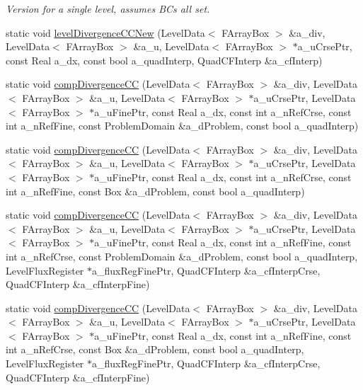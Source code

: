 \begin{DoxyCompactItemize}
\begin{DoxyCompactList}\small\item\em Version for a single level, assumes B\-Cs all set. \end{DoxyCompactList}\item 
static void \hyperlink{class_divergence_a77ec6a5b421cc2360223b7b0879786e8}{level\-Divergence\-C\-C\-New} (Level\-Data$<$ F\-Array\-Box $>$ \&a\-\_\-div, Level\-Data$<$ F\-Array\-Box $>$ \&a\-\_\-u, Level\-Data$<$ F\-Array\-Box $>$ $\ast$a\-\_\-u\-Crse\-Ptr, const Real a\-\_\-dx, const bool a\-\_\-quad\-Interp, Quad\-C\-F\-Interp \&a\-\_\-cf\-Interp)
\item 
static void \hyperlink{class_divergence_af3bff43b62b95d79fcd50484019e3e41}{comp\-Divergence\-C\-C} (Level\-Data$<$ F\-Array\-Box $>$ \&a\-\_\-div, Level\-Data$<$ F\-Array\-Box $>$ \&a\-\_\-u, Level\-Data$<$ F\-Array\-Box $>$ $\ast$a\-\_\-u\-Crse\-Ptr, Level\-Data$<$ F\-Array\-Box $>$ $\ast$a\-\_\-u\-Fine\-Ptr, const Real a\-\_\-dx, const int a\-\_\-n\-Ref\-Crse, const int a\-\_\-n\-Ref\-Fine, const Problem\-Domain \&a\-\_\-d\-Problem, const bool a\-\_\-quad\-Interp)
\item 
static void \hyperlink{class_divergence_ad1d85e2db60cacec07a004c9d0b19b24}{comp\-Divergence\-C\-C} (Level\-Data$<$ F\-Array\-Box $>$ \&a\-\_\-div, Level\-Data$<$ F\-Array\-Box $>$ \&a\-\_\-u, Level\-Data$<$ F\-Array\-Box $>$ $\ast$a\-\_\-u\-Crse\-Ptr, Level\-Data$<$ F\-Array\-Box $>$ $\ast$a\-\_\-u\-Fine\-Ptr, const Real a\-\_\-dx, const int a\-\_\-n\-Ref\-Crse, const int a\-\_\-n\-Ref\-Fine, const Box \&a\-\_\-d\-Problem, const bool a\-\_\-quad\-Interp)
\item 
static void \hyperlink{class_divergence_a4bafaf6a0fee4270b05bfb1b31c915ed}{comp\-Divergence\-C\-C} (Level\-Data$<$ F\-Array\-Box $>$ \&a\-\_\-div, Level\-Data$<$ F\-Array\-Box $>$ \&a\-\_\-u, Level\-Data$<$ F\-Array\-Box $>$ $\ast$a\-\_\-u\-Crse\-Ptr, Level\-Data$<$ F\-Array\-Box $>$ $\ast$a\-\_\-u\-Fine\-Ptr, const Real a\-\_\-dx, const int a\-\_\-n\-Ref\-Fine, const int a\-\_\-n\-Ref\-Crse, const Problem\-Domain \&a\-\_\-d\-Problem, const bool a\-\_\-quad\-Interp, Level\-Flux\-Register $\ast$a\-\_\-flux\-Reg\-Fine\-Ptr, Quad\-C\-F\-Interp \&a\-\_\-cf\-Interp\-Crse, Quad\-C\-F\-Interp \&a\-\_\-cf\-Interp\-Fine)
\item 
static void \hyperlink{class_divergence_ab20b13344306e041cbf99e4234a46244}{comp\-Divergence\-C\-C} (Level\-Data$<$ F\-Array\-Box $>$ \&a\-\_\-div, Level\-Data$<$ F\-Array\-Box $>$ \&a\-\_\-u, Level\-Data$<$ F\-Array\-Box $>$ $\ast$a\-\_\-u\-Crse\-Ptr, Level\-Data$<$ F\-Array\-Box $>$ $\ast$a\-\_\-u\-Fine\-Ptr, const Real a\-\_\-dx, const int a\-\_\-n\-Ref\-Fine, const int a\-\_\-n\-Ref\-Crse, const Box \&a\-\_\-d\-Problem, const bool a\-\_\-quad\-Interp, Level\-Flux\-Register $\ast$a\-\_\-flux\-Reg\-Fine\-Ptr, Quad\-C\-F\-Interp \&a\-\_\-cf\-Interp\-Crse, Quad\-C\-F\-Interp \&a\-\_\-cf\-Interp\-Fine)

\end{DoxyCompactItemize}
